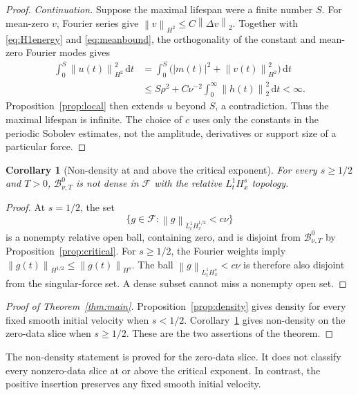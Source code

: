 \documentclass[11pt,a4paper]{article}
\newtheorem{corollary}[theorem]{Corollary}
\theoremstyle{definition}\newtheorem{definition}[theorem]{Definition}
\theoremstyle{remark}\newtheorem{remark}[theorem]{Remark}
\newcommand{\FF}{\mathcal F}\newcommand{\XX}{\mathcal X}
\newcommand{\BB}{\mathcal B}\newcommand{\PP}{\mathbb P}
\newcommand{\dd}{\,\mathrm d}\newcommand{\eps}{\varepsilon}
\newcommand{\norm}[1]{\left\lVert#1\right\rVert}
\begin{document}
\begin{proof}
\emph{Continuation.}
Suppose the maximal lifespan were a finite number $S$.
For mean-zero $v$, Fourier series give
$\norm{v}_{H^2}\le C\norm{\Delta v}_2$.
Together with \eqref{eq:H1energy} and \eqref{eq:meanbound}, the
orthogonality of the constant and mean-zero Fourier modes gives
\begin{align*}
 \int_0^S\norm{u(t)}_{H^2}^2\dd t
 &=\int_0^S\bigl(|m(t)|^2+\norm{v(t)}_{H^2}^2\bigr)\dd t\\
 &\le S\rho^2+C\nu^{-2}
             \int_0^\infty\norm{h(t)}_2^2\dd t<\infty.
\end{align*}
Proposition~\ref{prop:local} then extends $u$ beyond $S$, a contradiction.
Thus the maximal lifespan is infinite. The choice of $c$ uses only the constants in the periodic Sobolev estimates, not the amplitude, derivatives or support size of a particular force.
\end{proof}

\begin{corollary}[Non-density at and above the critical exponent]\label{cor:nondensity}
For every $s\ge1/2$ and $T>0$, $\BB^0_{\nu,T}$ is not dense in
$\FF$ with the relative $L^1_tH^s_x$ topology.
\end{corollary}
\begin{proof}
At $s=1/2$, the set
\[
 \{g\in\FF:\norm{g}_{L^1_tH^{1/2}_x}<c\nu\}
\]
is a nonempty relative open ball, containing zero, and is disjoint from
$\BB^0_{\nu,T}$ by Proposition~\ref{prop:critical}.
For $s\ge1/2$, the Fourier weights imply
$\norm{g(t)}_{H^{1/2}}\le\norm{g(t)}_{H^s}$.
The ball $\norm{g}_{L^1_tH^s_x}<c\nu$ is therefore also disjoint from the singular-force set. A dense subset cannot miss a nonempty open set.
\end{proof}

\begin{proof}[Proof of Theorem~\ref{thm:main}]
Proposition~\ref{prop:density} gives density for every fixed smooth initial velocity when $s<1/2$. Corollary~\ref{cor:nondensity} gives non-density on the zero-data slice when $s\ge1/2$. These are the two assertions of the theorem.
\end{proof}
The non-density statement is proved for the zero-data slice.
It does not classify every nonzero-data slice at or above the critical exponent. In contrast, the positive insertion preserves any fixed smooth initial velocity.
\end{document}
